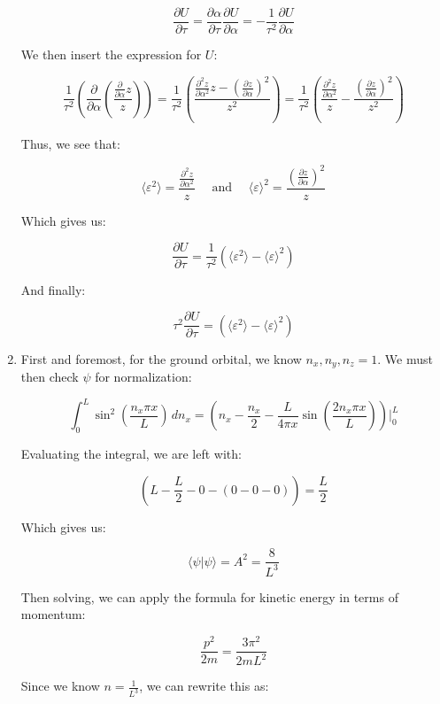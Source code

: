 \begin{enumerate}
    $$\frac{\partial U}{\partial\tau}=\frac{\partial\alpha}{\partial\tau}\frac{\partial U}{\partial\alpha}=-\frac{1}{\tau^2}\frac{\partial U}{\partial\alpha}$$

    We then insert the expression for $U$:

    $$\frac{1}{\tau^2}\left( \frac{\partial}{\partial\alpha}\left( \frac{\frac{\partial}{\partial\alpha}z}{z} \right) \right)=\frac{1}{\tau^2}\left( \frac{\frac{\partial^2z}{\partial\alpha^2}z-\left( \frac{\partial z}{\partial\alpha} \right)^2}{z^2} \right)=\frac{1}{\tau^2}\left( \frac{\frac{\partial^2z}{\partial\alpha^2}}{z}-\frac{\left( \frac{\partial z}{\partial\alpha} \right)^2}{z^2} \right)$$

    Thus, we see that:

    $$\langle\varepsilon^2\rangle=\frac{\frac{\partial^2z}{\partial\alpha^2}}{z}\quad\text{ and }\quad\langle\varepsilon\rangle^2=\frac{\left( \frac{\partial z}{\partial\alpha} \right)^2}{z}$$

    Which gives us:

    $$\frac{\partial U}{\partial \tau}=\frac{1}{\tau^2}\left( \langle\varepsilon^2\rangle-\langle\varepsilon\rangle^2 \right)$$

    And finally:

    $$\boxed{\tau^2\frac{\partial U}{\partial \tau}=\left( \langle\varepsilon^2\rangle-\langle\varepsilon\rangle^2 \right)}$$

    \setcounter{enumi}{7}

  \item

    First and foremost, for the ground orbital, we know $n_x,n_y,n_z=1$. We must then check $\psi$ for normalization:

    $$\int_0^L\sin^2\left( \frac{n_x\pi x}{L} \right)\,dn_x=\left( n_x-\frac{n_x}{2}-\frac{L}{4\pi x}\sin\left( \frac{2n_x\pi x}{L} \right) \right)\Big|_0^L$$

    Evaluating the integral, we are left with:

    $$\left( L-\frac{L}{2}-0-(0-0-0) \right)=\frac{L}{2}$$

    Which gives us:

    $$\langle\psi|\psi\rangle=A^2=\frac{8}{L^3}$$

    Then solving, we can apply the formula for kinetic energy in terms of momentum:

    $$\frac{p^2}{2m}=\frac{3\pi^2}{2mL^2}$$

    Since we know $n=\frac{1}{L^3}$, we can rewrite this as:


\end{enumerate}
